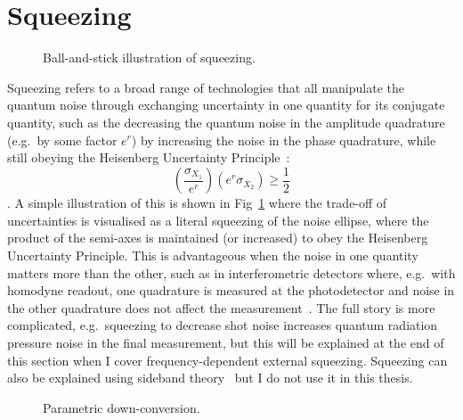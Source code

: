 \section{Squeezing}
\label{sec:squeezing_background}

\begin{figure}
	\centering
	\caption{Ball-and-stick illustration of squeezing.}
	\label{fig:ballandstick_simple}
\end{figure}

Squeezing refers to a broad range of technologies that all manipulate the quantum noise through exchanging uncertainty in one quantity for its conjugate quantity, such as the decreasing the quantum noise in the amplitude quadrature (e.g.\ by some factor $e^r$) by increasing the noise in the phase quadrature, while still obeying the Heisenberg Uncertainty Principle~\cite{}: $$(\frac{\sigma_{X_1}}{e^r}) (e^r\sigma_{X_2})\geq\frac{1}{2}\label{eq:HUP_squeezed}$$. A simple illustration of this is shown in Fig~\ref{fig:ballandstick_simple} where the trade-off of uncertainties is visualised as a literal squeezing of the noise ellipse, where the product of the semi-axes is maintained (or increased) to obey the Heisenberg Uncertainty Principle. This is advantageous when the noise in one quantity matters more than the other, such as in interferometric detectors where, e.g.\ with homodyne readout, one quadrature is measured at the photodetector and noise in the other quadrature does not affect the measurement~\cite{}.  The full story is more complicated, e.g.\ squeezing to decrease shot noise increases quantum radiation pressure noise in the final measurement, but this will be explained at the end of this section when I cover frequency-dependent external squeezing. Squeezing can also be explained using sideband theory~\cite{} but I do not use it in this thesis.

\begin{figure}
	\centering
	\caption{Parametric down-conversion.}
	\label{fig:PDC_deg_and_nondeg}
\end{figure}

